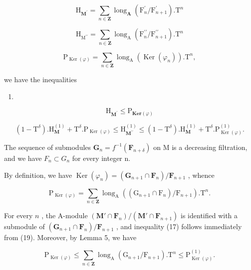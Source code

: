 \[
\mathrm{H} _ {\mathbf {M} ^ {\prime}} = \sum_ {n \in \mathbf {Z}} \operatorname{long} _ {\mathbf {A}} (\mathrm{F} _ {n} ^ {\prime} / \mathrm{F} _ {n + 1} ^ {\prime}). \mathrm{T} ^ {n}
\]

\[
\mathrm{H} _ {\mathrm{M} ^ {\prime \prime}} = \sum_ {n \in \mathbf {Z}} \operatorname{long} _ {\mathrm{A}} (\mathrm{F} _ {n} ^ {\prime \prime} / \mathrm{F} _ {n + 1} ^ {\prime \prime}). \mathrm{T} ^ {n}
\]

\[
\mathrm{P} _ {\operatorname{Ker} (\varphi)} = \sum_ {n \in \mathbf {Z}} \operatorname{long} _ {\mathrm{A}} (\operatorname{Ker} (\varphi_ {n})). \mathrm{T} ^ {n},
\]

we have the inequalities

\begin{enumerate}
\def\labelenumi{(\arabic{enumi})}
\setcounter{enumi}{16}
\tightlist
\item
\end{enumerate}

\[
\mathrm{H} _ {\mathbf {M} ^ {\prime}} \leqslant \mathrm{P} _ {\mathbf {K e r} (\varphi)}\tag{18}
\]

\[
(1 - \mathrm{T} ^ {\delta}). \mathrm{H} _ {\mathbf {M}} ^ {(1)} + \mathrm{T} ^ {\delta}. \mathrm{P} _ {\operatorname{Ker} (\varphi)} \leqslant \mathrm{H} _ {\mathbf {M} ^ {\prime \prime}} ^ {(1)} \leqslant (1 - \mathrm{T} ^ {\delta}). \mathrm{H} _ {\mathbf {M}} ^ {(1)} + \mathrm{T} ^ {\delta}. \mathrm{P} _ {\operatorname{Ker} (\varphi)} ^ {(1)}.
\]

The sequence of submodules \(\mathbf{G}_{n}=f^{-1}(\mathbf{F}_{n+\delta})\) on M is a decreasing filtration, and we have \(F_{n}\subset G_{n}\) for every integer n.

By definition, we have \(\operatorname{Ker}(\varphi_n) = (\mathbf{G}_{n+1} \cap \mathbf{F}_n)/\mathbf{F}_{n+1}\) , whence

\[
\mathrm{P} _ {\operatorname{Ker} (\varphi)} = \sum_ {n \in \mathbf {Z}} \operatorname{long} _ {\mathrm{A}} ((\mathrm{G} _ {n + 1} \cap \mathrm{F} _ {n}) / \mathrm{F} _ {n + 1}). \mathrm{T} ^ {n}.\tag{19}
\]

For every \(n\) , the A-module \((\mathbf{M}' \cap \mathbf{F}_n) / (\mathbf{M}' \cap \mathbf{F}_{n+1})\) is identified with a submodule of \((\mathbf{G}_{n+1} \cap \mathbf{F}_n) / \mathbf{F}_{n+1}\) , and inequality (17) follows immediately from (19). Moreover, by Lemma 5, we have

\[
\mathrm{P} _ {\operatorname{Ker} (\varphi)} \leqslant \sum_ {n \in \mathbf {Z}} \operatorname{long} _ {\mathrm{A}} \left(\mathrm{G} _ {n + 1} / \mathrm{F} _ {n + 1}\right). \mathrm{T} ^ {n} \leqslant \mathrm{P} _ {\operatorname{Ker} (\varphi)} ^ {(1)}.\tag{20}
\]

